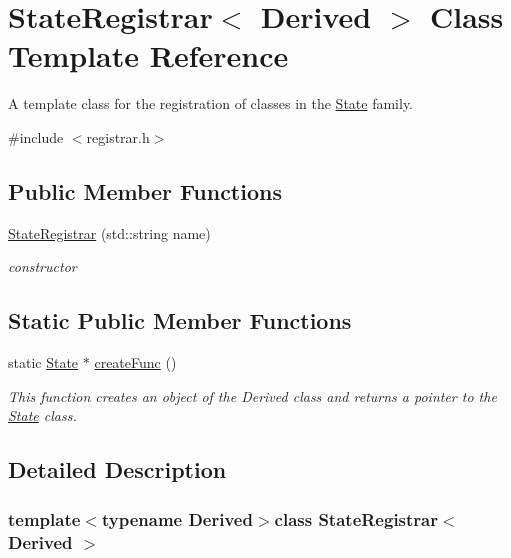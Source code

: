 \hypertarget{classStateRegistrar}{\section{State\-Registrar$<$ Derived $>$ Class Template Reference}
\label{classStateRegistrar}
}


A template class for the registration of classes in the \hyperlink{classState}{State} family.  




{\ttfamily \#include $<$registrar.\-h$>$}

\subsection*{Public Member Functions}
\begin{DoxyCompactItemize}
\item 
\hyperlink{classStateRegistrar_a2972e9ece50d079f090f70c3341f6126}{State\-Registrar} (std\-::string name)
\begin{DoxyCompactList}\small\item\em constructor \end{DoxyCompactList}\end{DoxyCompactItemize}
\subsection*{Static Public Member Functions}
\begin{DoxyCompactItemize}
\item 
static \hyperlink{classState}{State} $\ast$ \hyperlink{classStateRegistrar_ad88bb16cf3281084531dca90b907e6c8}{create\-Func} ()
\begin{DoxyCompactList}\small\item\em This function creates an object of the {\itshape Derived} class and returns a pointer to the \hyperlink{classState}{State} class. \end{DoxyCompactList}\end{DoxyCompactItemize}


\subsection{Detailed Description}
\subsubsection*{template$<$typename Derived$>$class State\-Registrar$<$ Derived $>$}

